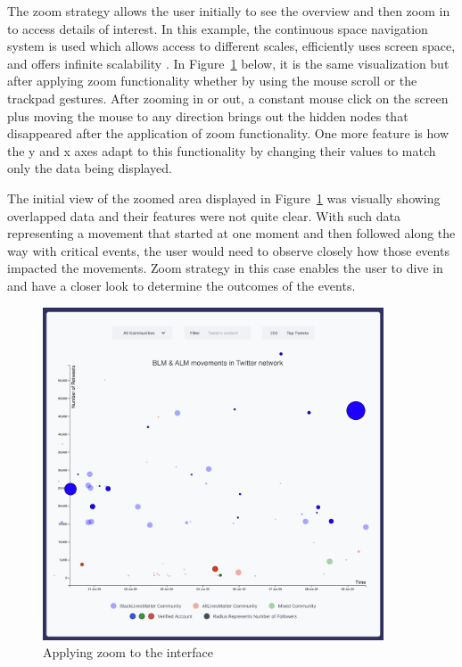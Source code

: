 The zoom strategy allows the user initially to see the overview and then zoom in to access details of interest. In this example, the continuous space navigation system is used which allows access to different scales, efficiently uses screen space, and offers infinite scalability \cite{bederson1994pad++, johnson1999tree}. In Figure~\ref{fig:e-zoom} below, it is the same visualization but after applying zoom functionality whether by using the mouse scroll or the trackpad gestures. After zooming in or out, a constant mouse click on the screen plus moving the mouse to any direction brings out the hidden nodes that disappeared after the application of zoom functionality. One more feature is how the y and x axes adapt to this functionality by changing their values to match only the data being displayed.  

The initial view of the zoomed area displayed in Figure~\ref{fig:e-zoom} was visually showing overlapped data and their features were not quite clear. With such data representing a movement that started at one moment and then followed along the way with critical events, the user would need to observe closely how those events impacted the movements. Zoom strategy in this case enables the user to dive in and have a closer look to determine the outcomes of the events.

\begin{figure}[H]
\centering
\captionsetup{justification=centering}
\includegraphics[width=0.9\textwidth]{Report-latex/tex_files/pics/example/zoom.png}
\caption{Applying zoom to the interface}
\label{fig:e-zoom}
\end{figure}


